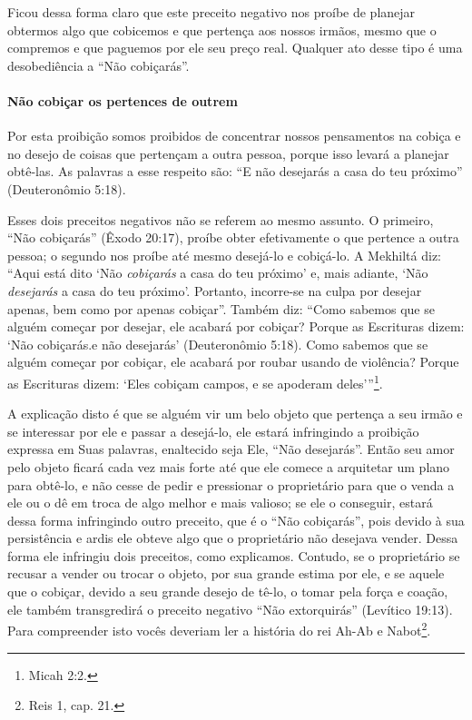 Ficou dessa forma claro que este preceito negativo nos proíbe de
planejar obtermos algo que cobicemos e que pertença aos nossos irmãos,
mesmo que o compremos e que paguemos por ele seu preço real. Qualquer
ato desse tipo é uma desobediência a ``Não cobiçarás''.

\paragraph{Não cobiçar os pertences de outrem}

Por esta proibição somos proibidos de concentrar nossos pensamentos na
cobiça e no desejo de coisas que pertençam a outra pessoa, porque isso
levará a planejar obtê-las. As palavras a esse respeito são: ``E não
desejarás a casa do teu próximo'' (Deuteronômio 5:18).

Esses dois preceitos negativos não se referem ao mesmo assunto. O
primeiro, ``Não cobiçarás'' (Êxodo 20:17), proíbe obter efetivamente o
que pertence a outra pessoa; o segundo nos proíbe até mesmo desejá-lo e
cobiçá-lo. A Mekhiltá diz: ``Aqui está dito `Não \emph{cobiçarás} a casa
do teu próximo' e, mais adiante, `Não \emph{desejarás} a casa do teu
próximo'. Portanto, incorre-se na culpa por desejar apenas, bem como por
apenas cobiçar''. Também diz: ``Como sabemos que se alguém começar por
desejar, ele acabará por cobiçar? Porque as Escrituras dizem: `Não
cobiçarás.e não desejarás' (Deuteronômio 5:18). Como sabemos que se
alguém começar por cobiçar, ele acabará por roubar usando de violência?
Porque as Escrituras dizem: `Eles cobiçam campos, e se apoderam
deles'''\footnote{Micah 2:2.}.

A explicação disto é que se alguém vir um belo objeto que pertença a seu
irmão e se interessar por ele e passar a desejá-lo, ele estará
infringindo a proibição expressa em Suas palavras, enaltecido seja Ele,
``Não desejarás''. Então seu amor pelo objeto ficará cada vez mais forte
até que ele comece a arquitetar um plano para obtê-lo, e não cesse de
pedir e pressionar o proprietário para que o venda a ele ou o dê em
troca de algo melhor e mais valioso; se ele o conseguir, estará dessa
forma infringindo outro preceito, que é o ``Não cobiçarás'', pois
devido à sua persistência e ardis ele obteve algo que o proprietário não
desejava vender. Dessa forma ele infringiu dois preceitos, como
explicamos. Contudo, se o proprietário se recusar a vender ou trocar o
objeto, por sua grande estima por ele, e se aquele que o cobiçar, devido
a seu grande desejo de tê-lo, o tomar pela força e coação, ele também
transgredirá o preceito negativo ``Não extorquirás'' (Levítico 19:13).
Para compreender isto vocês deveriam ler a história do rei Ah-Ab e
Nabot\footnote{Reis 1, cap. 21.}.

